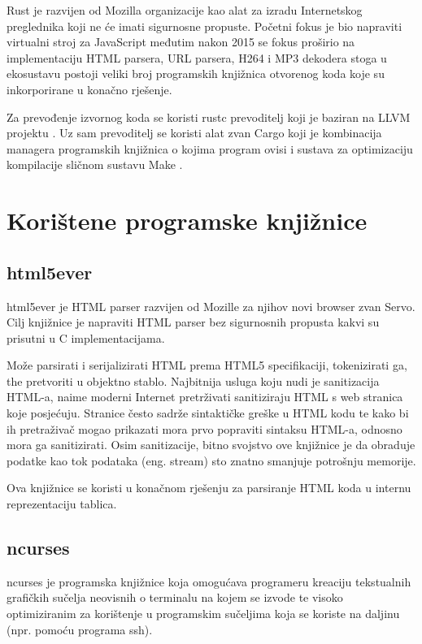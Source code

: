 \documentclass[times, utf8, zavrsni]{fer}
\begin{document}
Rust je razvijen od Mozilla organizacije kao alat za izradu Internetskog
preglednika koji ne će imati sigurnosne propuste. Početni fokus je bio
napraviti virtualni stroj za JavaScript međutim nakon 2015 se fokus proširio na
implementaciju HTML parsera, URL parsera, H264 i MP3 dekodera stoga u ekosustavu
postoji veliki broj programskih knjižnica otvorenog koda koje su inkorporirane
u konačno rješenje.

Za prevođenje izvornog koda se koristi rustc prevoditelj koji je baziran na
LLVM projektu \cite{llvm_page}. Uz sam prevoditelj se koristi alat zvan
Cargo \cite{cargo_documentation}
koji je kombinacija managera programskih knjižnica o kojima program ovisi i
sustava za optimizaciju kompilacije sličnom sustavu
Make \cite{make_documentation}.

\section{Korištene programske knjižnice}

\subsection{html5ever}

html5ever \cite{html5ever_repository} je HTML parser razvijen od Mozille za
njihov novi browser zvan Servo.
Cilj knjižnice je napraviti HTML parser bez sigurnosnih propusta kakvi su
prisutni u C implementacijama.

Može parsirati i serijalizirati HTML prema HTML5 specifikaciji, tokenizirati ga,
the pretvoriti u objektno stablo. Najbitnija usluga koju nudi je sanitizacija
HTML-a, naime moderni Internet pretrživati sanitiziraju HTML s web stranica
koje posjećuju. Stranice često sadrže sintaktičke greške u HTML kodu te kako
bi ih pretraživač mogao prikazati mora prvo popraviti sintaksu HTML-a,
odnosno mora ga sanitizirati. Osim sanitizacije, bitno svojstvo ove
knjižnice je da obraduje podatke kao tok podataka (eng. stream) sto znatno
smanjuje potrošnju memorije.

Ova knjižnice se koristi u konačnom rješenju za parsiranje HTML koda u
internu reprezentaciju tablica.

\subsection{ncurses}

ncurses \cite{ncurses_documentation} je programska knjižnice koja omogućava
programeru kreaciju
tekstualnih grafičkih sučelja neovisnih o terminalu na kojem se izvode te
visoko optimiziranim za korištenje u programskim sučeljima koja se koriste na
daljinu (npr. pomoću programa ssh).
\end{document}
